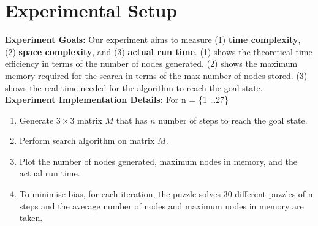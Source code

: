 \documentclass[runningheads]{llncs}
\begin{document}
\section{Experimental Setup}
\textbf{Experiment Goals:} Our experiment aims to measure (1) \textbf{time complexity}, (2) \textbf{space complexity}, and (3) \textbf{actual run time}. 
(1) shows the theoretical time efficiency in terms of the number of nodes generated. %
(2) shows the maximum memory required for the search in terms of the max number of nodes stored. %
(3) shows the real time needed for the algorithm to reach the goal state. \\ %
\textbf{Experiment Implementation Details:} For n = \{1 \dots 27\}
\begin{enumerate}
    \item Generate \(3 \times 3 \) matrix \( M \) that has \( n \) number of steps to reach the goal state.
    \item Perform search algorithm on matrix \( M \).
    \item Plot the number of nodes generated, maximum nodes in memory, and the actual run time.
    \item To minimise bias, for each iteration, the puzzle solves 30 different puzzles of n steps and the average number of nodes and maximum nodes in memory are taken.
\end{enumerate}
\end{document}
